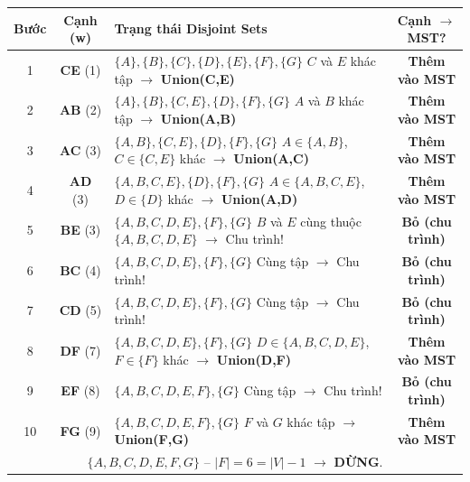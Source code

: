 \documentclass[10pt]{article}
\begin{document}
\begin{center}
\renewcommand{\arraystretch}{1.5}
\begin{tabular}{|c|c|p{7.3cm}|c|}
\hline
\textbf{Bước} & \textbf{Cạnh (w)} & \textbf{Trạng thái Disjoint Sets} & \textbf{Cạnh $\to$ MST?} \\
\hline
1 & \textbf{CE} (1) & $\{A\},\{B\},\{C\},\{D\},\{E\},\{F\},\{G\}$ \newline $C$ và $E$ khác tập $\to$ \textbf{Union(C,E)} & \cellcolor{green!15} \textbf{Thêm vào MST} \\
\hline
2 & \textbf{AB} (2) & $\{A\},\{B\},\{C,E\},\{D\},\{F\},\{G\}$ \newline $A$ và $B$ khác tập $\to$ \textbf{Union(A,B)} & \cellcolor{green!15} \textbf{Thêm vào MST} \\
\hline
3 & \textbf{AC} (3) & $\{A,B\},\{C,E\},\{D\},\{F\},\{G\}$ \newline $A\in\{A,B\}$, $C\in\{C,E\}$ khác $\to$ \textbf{Union(A,C)} & \cellcolor{green!15} \textbf{Thêm vào MST} \\
\hline
4 & \textbf{AD} (3) & $\{A,B,C,E\},\{D\},\{F\},\{G\}$ \newline $A\in\{A,B,C,E\}$, $D\in\{D\}$ khác $\to$ \textbf{Union(A,D)} & \cellcolor{green!15} \textbf{Thêm vào MST} \\
\hline
5 & \textbf{BE} (3) & $\{A,B,C,D,E\},\{F\},\{G\}$ \newline \textcolor{red!80!black}{$B$ và $E$ cùng thuộc $\{A,B,C,D,E\}$ $\to$ Chu trình!} & \cellcolor{red!15} \textbf{Bỏ (chu trình)} \\
\hline
6 & \textbf{BC} (4) & $\{A,B,C,D,E\},\{F\},\{G\}$ \newline \textcolor{red!80!black}{Cùng tập $\to$ Chu trình!} & \cellcolor{red!15} \textbf{Bỏ (chu trình)} \\
\hline
7 & \textbf{CD} (5) & $\{A,B,C,D,E\},\{F\},\{G\}$ \newline \textcolor{red!80!black}{Cùng tập $\to$ Chu trình!} & \cellcolor{red!15} \textbf{Bỏ (chu trình)} \\
\hline
8 & \textbf{DF} (7) & $\{A,B,C,D,E\},\{F\},\{G\}$ \newline $D\in\{A,B,C,D,E\}$, $F\in\{F\}$ khác $\to$ \textbf{Union(D,F)} & \cellcolor{green!15} \textbf{Thêm vào MST} \\
\hline
9 & \textbf{EF} (8) & $\{A,B,C,D,E,F\},\{G\}$ \newline \textcolor{red!80!black}{Cùng tập $\to$ Chu trình!} & \cellcolor{red!15} \textbf{Bỏ (chu trình)} \\
\hline
10 & \textbf{FG} (9) & $\{A,B,C,D,E,F\},\{G\}$ \newline $F$ và $G$ khác tập $\to$ \textbf{Union(F,G)} & \cellcolor{green!15} \textbf{Thêm vào MST} \\
\hline
\multicolumn{4}{|c|}{$\{A,B,C,D,E,F,G\}$ -- $|F|=6=|V|-1$ $\to$ \textbf{DỪNG}.} \\
\hline
\end{tabular}
\label{tab:kruskal-trace}
\end{center}
\vspace{0.3cm}
\end{document}
